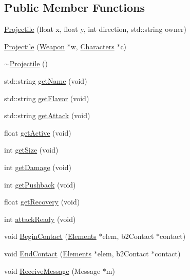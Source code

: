 \subsection*{Public Member Functions}
\begin{DoxyCompactItemize}
\item 
\hyperlink{class_projectile_aa77304b2b631673899c673ea5ff660bd}{Projectile} (float x, float y, int direction, std\-::string owner)
\item 
\hyperlink{class_projectile_a2131209b192886d9be4fcabe3511a1d3}{Projectile} (\hyperlink{class_weapon}{Weapon} $\ast$w, \hyperlink{class_characters}{Characters} $\ast$c)
\item 
\hyperlink{class_projectile_a94903e021fa2edab60ba3836ca0b937d}{$\sim$\-Projectile} ()
\item 
std\-::string \hyperlink{class_projectile_ace3baa31fb47d65321b3091e55ea0214}{get\-Name} (void)
\item 
std\-::string \hyperlink{class_projectile_a259c762588761610eb08f4590409be47}{get\-Flavor} (void)
\item 
std\-::string \hyperlink{class_projectile_a3d296e98b7227371fdfcfd9fef8bf505}{get\-Attack} (void)
\item 
float \hyperlink{class_projectile_a2342bda48bea3511d0b97f5cba7b095f}{get\-Active} (void)
\item 
int \hyperlink{class_projectile_a284ae1c52821f8a9bd5972793eb210d8}{get\-Size} (void)
\item 
int \hyperlink{class_projectile_ab86af40b130ac18871e9a4baec80dc85}{get\-Damage} (void)
\item 
int \hyperlink{class_projectile_ad54c17a658890109a332e643bb8446f2}{get\-Pushback} (void)
\item 
float \hyperlink{class_projectile_acf9cf10cbb254d444c9b617bd0baf075}{get\-Recovery} (void)
\item 
int \hyperlink{class_projectile_acdc9aa548f9606221bb3fe15e4a7dfa7}{attack\-Ready} (void)
\item 
void \hyperlink{class_projectile_a7347375e9c8cae921709ba56265af0fd}{Begin\-Contact} (\hyperlink{class_elements}{Elements} $\ast$elem, b2\-Contact $\ast$contact)
\item 
void \hyperlink{class_projectile_a9f8fa9403a414fa1fd6ee092720ca4e6}{End\-Contact} (\hyperlink{class_elements}{Elements} $\ast$elem, b2\-Contact $\ast$contact)
\item 
void \hyperlink{class_projectile_aa5247586a6ca84625abed35767b8f282}{Receive\-Message} (Message $\ast$m)
\end{DoxyCompactItemize}

